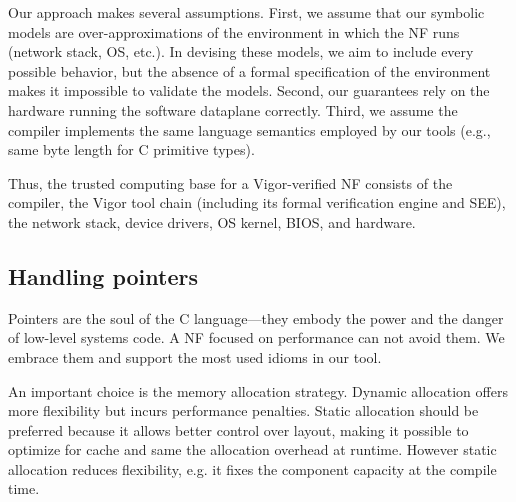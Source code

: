 \documentclass[letterpaper,twocolumn,10pt]{article}
\begin{document}
Our approach makes several assumptions. First, we assume that our symbolic models are over-approximations of the environment in which the NF runs (network stack, OS, etc.). In devising these models, we aim to include every possible behavior, but the absence of a formal specification of the environment makes it impossible to validate the models. Second, our guarantees rely on the hardware running the software dataplane correctly. Third, we assume the compiler implements the same language semantics employed by our tools (e.g., same byte length for C primitive types).

Thus, the trusted computing base for a Vigor-verified NF consists of the compiler, the Vigor tool chain (including its formal verification engine and SEE), the network stack, device drivers, OS kernel, BIOS, and hardware.



\subsection{Handling pointers}
\label{sec:handling-pointers}

Pointers are the soul of the C language---they embody the power and the danger of low-level systems code. A NF focused on performance can not avoid them. We embrace them and support the most used idioms in our tool.

An important choice is the memory allocation strategy. Dynamic allocation offers more flexibility but incurs performance penalties. Static allocation should be preferred because it allows better control over layout, making it possible to optimize for cache and same the allocation overhead at runtime. However static allocation reduces flexibility, e.g. it fixes the component capacity at the compile time.
\end{document}
